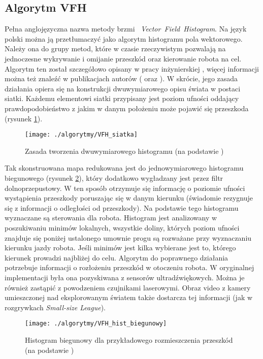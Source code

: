 \subsection{Algorytm VFH}
	Pełna  anglojęzyczna nazwa metody brzmi \mbox{ \emph{Vector Field Histogram}}. Na język polski można ją
	przetłumaczyć jako algorytm histogramu pola wektorowego. Należy ona do grupy metod, które w czasie
	rzeczywistym pozwalają na jednoczesne wykrywanie i omijanie przeszkód oraz kierowanie robota na cel.
	Algorytm ten został szczegółowo opisany w pracy inżynierskiej \cite{inzynierka}, więcej informacji można też znaleźć w publikacjach autorów (\cite{VFH_1} oraz \cite{VFH_2}).
	W skrócie, jego zasada działania opiera się na konstrukcji dwuwymiarowego opisu świata w postaci siatki. Każdemu elementowi siatki przypisany jest poziom ufności oddający prawdopodobieństwo
	z jakim w danym położeniu może pojawić się przeszkoda (rysunek \ref{fig:VFH_siatka}).
	\begin{figure}[H]
	\centering
	\texttt{[image: ./algorytmy/VFH\_siatka]}
	\caption{ Zasada tworzenia dwuwymiarowego histogramu \newline(na podstawie \cite{VFH_2})}\label{fig:VFH_siatka}
	\end{figure}
	Tak skonstruowana mapa redukowana jest do jednowymiarowego histogramu biegunowego (rysunek \ref{fig:VFH_hist_biegunowy}), który dodatkowo wygładzany jest przez
	filtr dolnoprzepustowy. W ten sposób otrzymuje się informację o poziomie ufności wystąpienia przeszkody poruszając się w danym kierunku (świadomie rezygnuje się z informacji o odległości od przeszkody).
	Na podstawie tego histogramu wyznaczane są sterowania dla robota. Histogram jest analizowany w poszukiwaniu minimów lokalnych, wszystkie doliny, których poziom ufności
	znajduje się poniżej ustalonego umownie progu są rozważane przy wyznaczaniu kierunku jazdy robota. Jeśli minimów jest kilka wybierane jest to, którego kierunek prowadzi najbliżej
	do celu. 
	Algorytm do poprawnego działania  potrzebuje informacji o rozłożeniu przeszkód w otoczeniu robota. W oryginalnej implementacji była ona pozyskiwana z sensorów ultradźwiękowych.
	Można je również zastąpić z powodzeniem czujnikami laserowymi. Obraz video z kamery umieszczonej nad eksplorowanym światem także dostarcza tej informacji (jak w rozgrywkach \emph{Small-size League}).
	\begin{figure}[H]
	\centering
	\texttt{[image: ./algorytmy/VFH\_hist\_biegunowy]}
	\caption{ Histogram biegunowy dla przykładowego rozmieszczenia przeszkód \newline(na podstawie \cite{ISR})}\label{fig:VFH_hist_biegunowy}
	\end{figure}

